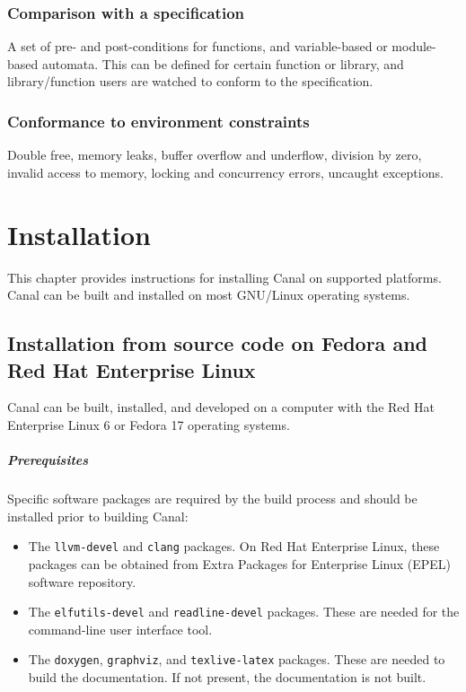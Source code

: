 \documentclass[a4paper]{book}
\begin{document}
\subsection{Comparison with a specification}
A set of pre- and post-conditions for functions, and variable-based or
module-based automata.  This can be defined for certain function or
library, and library/function users are watched to conform to the
specification.

\subsection{Conformance to environment constraints}
Double free, memory leaks, buffer overflow and underflow, division by
zero, invalid access to memory, locking and concurrency errors,
uncaught exceptions.


\chapter{Installation}

This chapter provides instructions for installing Canal on supported
platforms.  Canal can be built and installed on most GNU/Linux
operating systems.


\section{Installation from source code on Fedora and Red Hat Enterprise Linux}

Canal can be built, installed, and developed on a computer with the
Red Hat Enterprise Linux 6 or Fedora 17 operating systems.

\paragraph*{Prerequisites}
Specific software packages are required by the build process and
should be installed prior to building Canal:
\begin{itemize}
\item The \texttt{llvm-devel} and \texttt{clang} packages.  On Red Hat
  Enterprise Linux, these packages can be obtained from Extra Packages
  for Enterprise Linux (EPEL) software repository.
\item The \texttt{elfutils-devel} and \texttt{readline-devel} packages.
  These are needed for the command-line user interface tool.
\item The \texttt{doxygen}, \texttt{graphviz}, and
  \texttt{texlive-latex} packages.  These are needed to build the
  documentation.  If not present, the documentation is not built.
\end{itemize}
\end{document}
